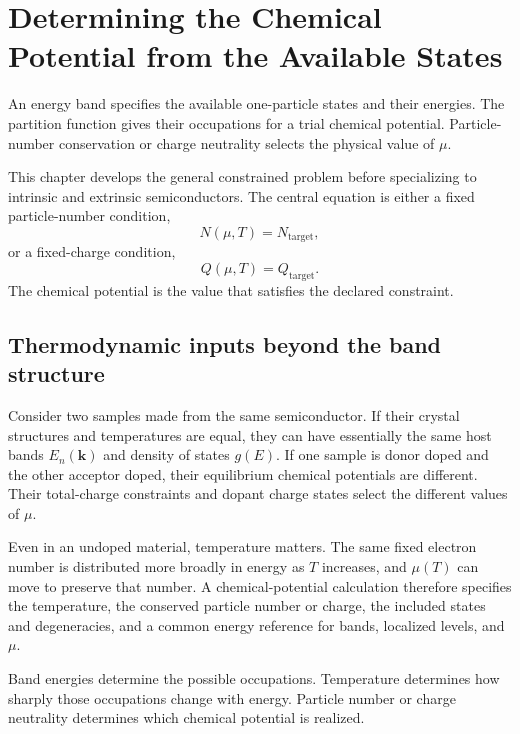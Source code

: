 \chapter{Determining the Chemical Potential from the Available States}
\label{ch:determining-chemical-potential}

An energy band specifies the available one-particle states and their energies.
The partition function gives their occupations for a trial chemical potential.
Particle-number conservation or charge neutrality selects the physical value of
$\mu$.

This chapter develops the general constrained problem before specializing to
intrinsic and extrinsic semiconductors.  The central equation is either a fixed
particle-number condition,
\begin{equation}
  N(\mu,T)=N_{\mathrm{target}},
  \label{eq:general-fixed-particle-constraint}
\end{equation}
or a fixed-charge condition,
\begin{equation}
  Q(\mu,T)=Q_{\mathrm{target}}.
  \label{eq:general-fixed-charge-constraint}
\end{equation}
The chemical potential is the value that satisfies the declared constraint.

\section{Thermodynamic inputs beyond the band structure}

Consider two samples made from the same semiconductor.  If their crystal
structures and temperatures are equal, they can have essentially the same host
bands $E_n(\bm k)$ and density of states $g(E)$.  If one sample is donor doped
and the other acceptor doped, their equilibrium chemical potentials are
different.  Their total-charge constraints and dopant charge states select the
different values of $\mu$.

Even in an undoped material, temperature matters.  The same fixed electron
number is distributed more broadly in energy as $T$ increases, and $\mu(T)$ can
move to preserve that number.  A chemical-potential calculation therefore specifies the temperature, the
conserved particle number or charge, the included states and degeneracies, and a
common energy reference for bands, localized levels, and $\mu$.

\begin{boundarybox}
Band energies determine the possible occupations.  Temperature determines how
sharply those occupations change with energy.  Particle number or charge
neutrality determines which chemical potential is realized.
\end{boundarybox}

